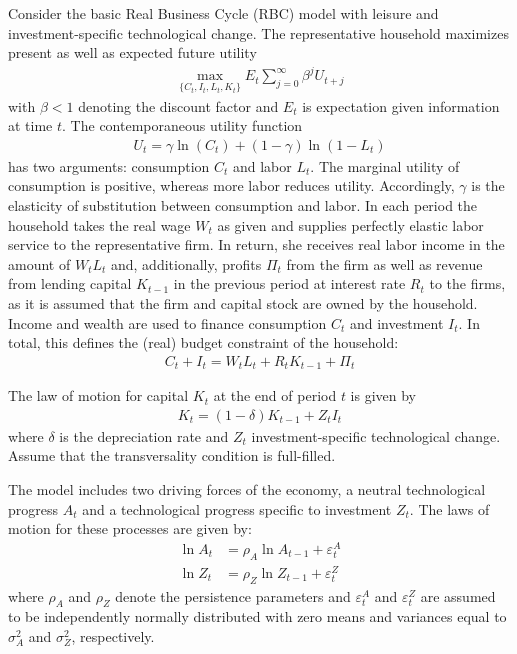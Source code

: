 Consider the basic Real Business Cycle (RBC) model with leisure and investment-specific technological change. The representative household maximizes present as well as expected future utility
\begin{align*}
    \underset{\{C_{t},I_{t},L_t,K_{t}\}}{\max} E_t \sum_{j=0}^{\infty} \beta^{j} U_{t+j}
\end{align*}
with $\beta <1$ denoting the discount factor and $E_t$ is expectation given information at time $t$. The contemporaneous utility function
\begin{align*}
    U_t = \gamma \ln(C_t) + (1-\gamma) \ln{(1-L_t)}
\end{align*}
has two arguments: consumption $C_t$ and labor $L_t$. The marginal utility of consumption is positive, whereas more labor reduces utility. Accordingly, $\gamma$ is the elasticity of substitution between consumption and labor. In each period the household takes the real wage $W_t$ as given and supplies perfectly elastic labor service to the representative firm. In return, she receives real labor income in the amount of $W_t L_t$ and, additionally, profits $\Pi_t$ from the firm as well as revenue from lending capital $K_{t-1}$ in the previous period at interest rate $R_t$ to the firms, as it is assumed that the firm and capital stock are owned by the household. Income and wealth are used to finance consumption $C_t$ and investment $I_t$. In total, this defines the (real) budget constraint of the household:
\begin{align*}
    C_t + I_t = W_t L_t + R_t K_{t-1} + \Pi_t
\end{align*}

The law of motion for capital $K_t$ at the end of period $t$ is given by
\begin{align*}
    K_{t} = (1-\delta)K_{t-1} + Z_t I_t
\end{align*}
where $\delta$ is the depreciation rate and $Z_t$ investment-specific technological change. Assume that the transversality condition is full-filled.

The model includes two driving forces of the economy, a neutral technological progress $A_t$ and a technological progress specific to investment $Z_t$. The laws of motion for these processes are given by:
\begin{align*}
    \ln{A_{t}} & = \rho_A \ln{A_{t-1}}  + \varepsilon_t^A \\
    \ln{Z_{t}} & = \rho_Z \ln{Z_{t-1}}  + \varepsilon_t^Z
\end{align*}
where $\rho_A$ and $\rho_Z$ denote the persistence parameters and $\varepsilon_t^A$ and $\varepsilon_t^Z$ are assumed to be independently normally distributed with zero means and variances equal to $\sigma_A^2$ and $\sigma_Z^2$, respectively.

